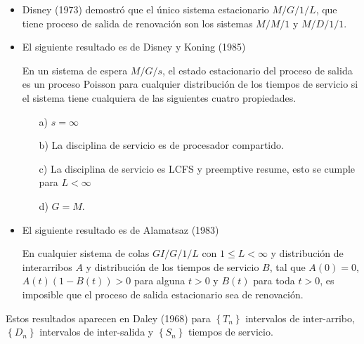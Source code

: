 \begin{itemize}
\item Disney (1973) demostr\'o que el \'unico sistema estacionario $M/G/1/L$, que tiene proceso de salida de renovaci\'on  son los sistemas $M/M/1$ y $M/D/1/1$.



\item El siguiente resultado es de Disney y Koning (1985)
\begin{Teo}
En un sistema de espera $M/G/s$, el estado estacionario del proceso de salida es un proceso Poisson para cualquier distribuci\'on de los tiempos de servicio si el sistema tiene cualquiera de las siguientes cuatro propiedades.

\begin{itemize}
\item[a)] $s=\infty$
\item[b)] La disciplina de servicio es de procesador compartido.
\item[c)] La disciplina de servicio es LCFS y preemptive resume, esto se cumple para $L<\infty$
\item[d)] $G=M$.
\end{itemize}

\end{Teo}

\item El siguiente resultado es de Alamatsaz (1983)

\begin{Teo}
En cualquier sistema de colas $GI/G/1/L$ con $1\leq L<\infty$ y distribuci\'on de interarribos $A$ y distribuci\'on de los tiempos de servicio $B$, tal que $A\left(0\right)=0$, $A\left(t\right)\left(1-B\left(t\right)\right)>0$ para alguna $t>0$ y $B\left(t\right)$ para toda $t>0$, es imposible que el proceso de salida estacionario sea de renovaci\'on.
\end{Teo}

\end{itemize}

Estos resultados aparecen en Daley (1968) \cite{Daley68} para $\left\{T_{n}\right\}$ intervalos de inter-arribo, $\left\{D_{n}\right\}$ intervalos de inter-salida y $\left\{S_{n}\right\}$ tiempos de servicio.

